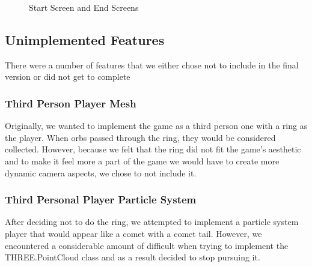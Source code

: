 \documentclass{article}
\begin{document}
\begin{figure}[H]
\begin{center}
\caption{Start Screen and End Screens}
\end{center}
\end{figure}

\subsection{Unimplemented Features}
There were a number of features that we either chose not to include in the final version or did not get to complete

\subsubsection{Third Person Player Mesh}
Originally, we wanted to implement the game as a third person one with a ring as the player. When orbs passed through the ring, they would be considered collected. However, because we felt that the ring did not fit the game's aesthetic and to make it feel more a part of the game we would have to create more dynamic camera aspects, we chose to not include it.

\subsubsection{Third Personal Player Particle System}
After deciding not to do the ring, we attempted to implement a particle system player that would appear like a comet with a comet tail. However, we encountered a considerable amount of difficult when trying to implement the THREE.PointCloud class and as a result decided to stop pursuing it.
\end{document}
